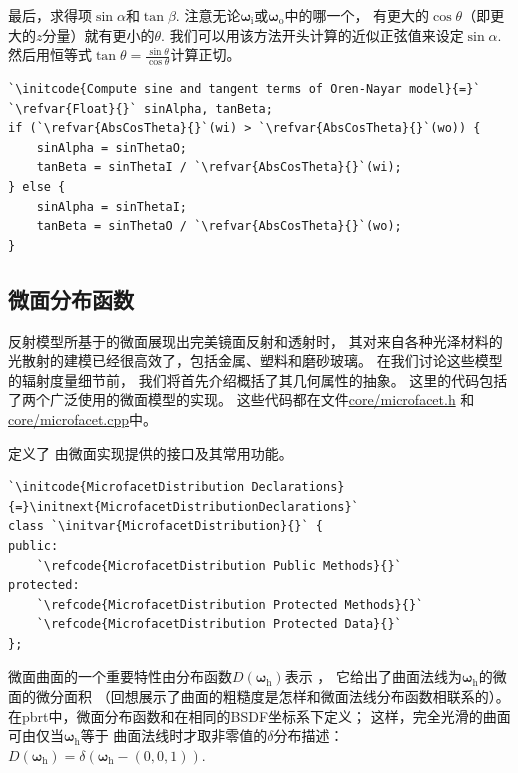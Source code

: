 最后，求得项$\sin\alpha$和$\tan\beta$.
注意无论${\bm\omega}_{\mathrm{i}}$或${\bm\omega}_{\mathrm{o}}$中的哪一个，
有更大的$\cos\theta$（即更大的$z$分量）就有更小的$\theta$.
我们可以用该方法开头计算的近似正弦值来设定$\sin\alpha$.
然后用恒等式$\displaystyle\tan\theta=\frac{\sin\theta}{\cos\theta}$计算正切。
\begin{lstlisting}
`\initcode{Compute sine and tangent terms of Oren-Nayar model}{=}`
`\refvar{Float}{}` sinAlpha, tanBeta;
if (`\refvar{AbsCosTheta}{}`(wi) > `\refvar{AbsCosTheta}{}`(wo)) {
    sinAlpha = sinThetaO;
    tanBeta = sinThetaI / `\refvar{AbsCosTheta}{}`(wi);
} else {
    sinAlpha = sinThetaI;
    tanBeta = sinThetaO / `\refvar{AbsCosTheta}{}`(wo);
}
\end{lstlisting}

\subsection{微面分布函数}\label{sub:微面分布函数}
反射模型所基于的微面展现出完美镜面反射和透射时，
其对来自各种光泽材料的光散射的建模已经很高效了，包括金属、塑料和磨砂玻璃。
在我们讨论这些模型的辐射度量细节前，
我们将首先介绍概括了其几何属性的抽象。
这里的代码包括了两个广泛使用的微面模型的实现。
这些代码都在文件\href{https://github.com/mmp/pbrt-v3/tree/master/src/core/microfacet.h}{\ttfamily core/microfacet.h}
和\href{https://github.com/mmp/pbrt-v3/tree/master/src/core/microfacet.cpp}{\ttfamily core/microfacet.cpp}中。

定义了
由微面实现提供的接口及其常用功能。
\begin{lstlisting}
`\initcode{MicrofacetDistribution Declarations}{=}\initnext{MicrofacetDistributionDeclarations}`
class `\initvar{MicrofacetDistribution}{}` {
public:
    `\refcode{MicrofacetDistribution Public Methods}{}`
protected:
    `\refcode{MicrofacetDistribution Protected Methods}{}`
    `\refcode{MicrofacetDistribution Protected Data}{}`
};
\end{lstlisting}

微面曲面的一个重要特性由分布函数$D({\bm\omega}_{\mathrm{h}})$表示
，
它给出了曲面法线为${\bm\omega}_{\mathrm{h}}$的微面的微分面积
（回想展示了曲面的粗糙度是怎样和微面法线分布函数相联系的）。
在pbrt中，微面分布函数和在相同的BSDF坐标系下定义；
这样，完全光滑的曲面可由仅当${\bm\omega}_{\mathrm{h}}$等于
曲面法线时才取非零值的$\delta$分布描述：$D({\bm\omega}_{\mathrm{h}})=\delta({\bm\omega}_{\mathrm{h}}-(0,0,1))$.


